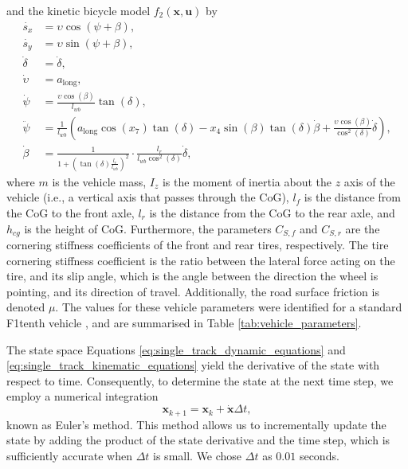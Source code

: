 and the kinetic bicycle model $f_2(\mathbf{x}, \mathbf{u})$ by 
\begin{equation}
\begin{split}
    \dot{s_x} &= \upsilon \cos(\psi + \beta), \\
    \dot{s_y} &= \upsilon \sin(\psi + \beta), \\
    \dot{\delta} &= \dot{\delta}, \\
    \dot{\upsilon} &= a_{\text{long}}, \\
    \dot{\psi} &= \frac{\upsilon \cos(\beta)}{l_{wb}} \tan(\delta), \\
    \ddot{\psi} &= \frac{1}{l_{wb}} (a_{\text{long}} \cos(x_7)\tan(\delta) - x_4\sin(\beta)\tan(\delta)\dot{\beta} + \frac{\upsilon \cos(\beta)}{\cos^2(\delta)} \dot{\delta} ), \\
    \dot{\beta} &= \frac{1}{1+(\tan(\delta)\frac{l_r}{l_{wb}})^2} \cdot \frac{l_r}{l_{wb} \cos^2(\delta)} \dot{\delta},
\label{eq:single_track_kinematic_equations}
\end{split}
\end{equation}
where $m$ is the vehicle mass, $I_z$ is the moment of inertia about the $z$ axis of the vehicle (i.e., a vertical axis that passes through the CoG), $l_f$ is the distance from the CoG to the front axle, $l_r$ is the distance from the CoG to the rear axle, and $h_{cg}$ is the height of CoG.
Furthermore, the parameters $C_{S,f}$ and $C_{S,r}$ are the cornering stiffness coefficients of the front and rear tires, respectively.
The tire cornering stiffness coefficient is the ratio between the lateral force acting on the tire, and its slip angle, which is the angle between the direction the wheel is pointing, and its direction of travel.
Additionally, the road surface friction is denoted $\mu$.
The values for these vehicle parameters were identified for a standard F1tenth vehicle \cite{f1tenth}, and are summarised in Table \ref{tab:vehicle_parameters}. 





The state space Equations \ref{eq:single_track_dynamic_equations} and \ref{eq:single_track_kinematic_equations} yield the derivative of the state with respect to time. 
Consequently, to determine the state at the next time step, we employ a numerical integration 
\begin{equation}\label{eq:euler}
\mathbf{x}_{k+1} = \mathbf{x}_k + \mathbf{\dot{x}} \Delta t,
\end{equation}
known as Euler's method. 
This method allows us to incrementally update the state by adding the product of the state derivative and the time step, which is sufficiently accurate when $\Delta t$ is small.
We chose $\Delta t$ as $0.01$ seconds.


